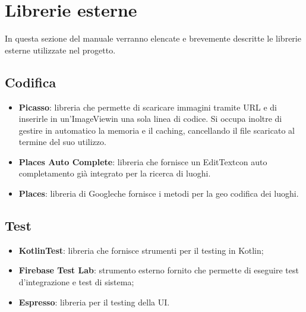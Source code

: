 \section{Librerie esterne}
In questa sezione del manuale verranno elencate e brevemente descritte le librerie esterne utilizzate nel progetto.
\subsection{Codifica}
\begin{itemize}
	\item \textbf{Picasso}: libreria che permette di scaricare immagini tramite URL e di inserirle in un'ImageView\glosp in una sola linea di codice. Si occupa inoltre di gestire in automatico la memoria e il caching, cancellando il file scaricato al termine del suo utilizzo.
	\item \textbf{Places Auto Complete}: libreria che fornisce un EditText\glosp con auto completamento già integrato per la ricerca di luoghi.
	\item \textbf{Places}: libreria di Google\glosp che fornisce i metodi per la geo codifica dei luoghi.
\end{itemize}
\subsection{Test}
\begin{itemize}
	\item \textbf{KotlinTest}: libreria che fornisce strumenti per il testing in Kotlin\glo;
	\item \textbf{Firebase Test Lab}: strumento esterno fornito che permette di eseguire test d'integrazione e test di sistema;
	\item \textbf{Espresso}: libreria per il testing della UI.
\end{itemize}